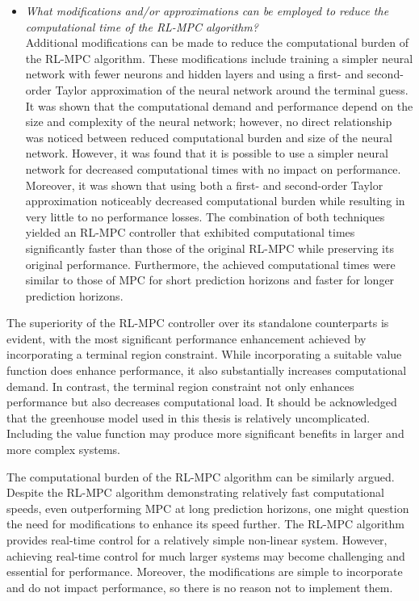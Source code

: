 \begin{itemize}[itemsep=7pt] %
	\item \textit{What modifications and/or approximations can be employed to reduce the computational time of the RL-MPC algorithm?}
	\\Additional modifications can be made to reduce the computational burden of the RL-MPC algorithm. These modifications include training a simpler neural network with fewer neurons and hidden layers and using a first- and second-order Taylor approximation of the neural network around the terminal guess. It was shown that the computational demand and performance depend on the size and complexity of the neural network; however, no direct relationship was noticed between reduced computational burden and size of the neural network. However, it was found that it is possible to use a  simpler neural network for decreased computational times with no impact on performance. Moreover, it was shown that using both a first- and second-order Taylor approximation noticeably decreased computational burden while resulting in very little to no performance losses. The combination of both techniques yielded an RL-MPC controller that exhibited computational times significantly faster than those of the original RL-MPC while preserving its original performance. Furthermore, the achieved computational times were similar to those of MPC for short prediction horizons and faster for longer prediction horizons. 
\end{itemize}

The superiority of the RL-MPC controller over its standalone counterparts is evident, with the most significant performance enhancement achieved by incorporating a terminal region constraint. While incorporating a suitable value function does enhance performance, it also substantially increases computational demand. In contrast, the terminal region constraint not only enhances performance but also decreases computational load. It should be acknowledged that the greenhouse model used in this thesis is relatively uncomplicated. Including the value function may produce more significant benefits in larger and more complex systems.

The computational burden of the RL-MPC algorithm can be similarly argued. Despite the RL-MPC algorithm demonstrating relatively fast computational speeds, even outperforming MPC at long prediction horizons, one might question the need for modifications to enhance its speed further. The RL-MPC algorithm provides real-time control for a relatively simple non-linear system. However, achieving real-time control for much larger systems may become challenging and essential for performance. Moreover, the modifications are simple to incorporate and do not impact performance, so there is no reason not to implement them.

